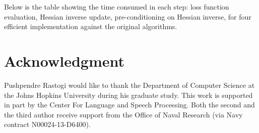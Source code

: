 \documentclass[conference]{IEEEtran}
\begin{document}
Below is the table showing the time consumed in each step: loss function evaluation, Hessian inverse update, pre-conditioning on Hessian inverse, for four efficient implementation against the original algorithms.




\section*{Acknowledgment}
Pushpendre Rastogi would like to thank the Department of Computer Science at the Johns Hopkins University during his graduate study. This work is supported in part by the Center For Language and Speech Processing. Both the second and the third author receive support from the Office of Naval Research (via Navy contract N00024-13-D6400).


\end{document}
